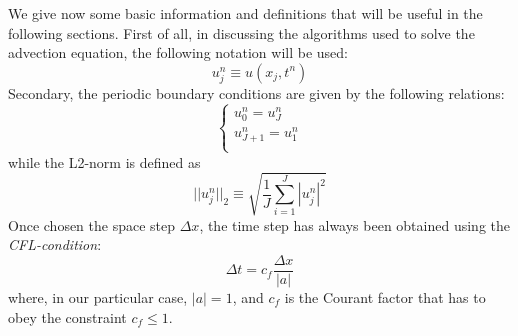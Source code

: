 \documentclass[11pt,a4paper]{article}
\begin{document}
We give now some basic information and definitions that will be useful in the following sections. First of all, in discussing the algorithms used to solve the advection equation, the following notation will be used:
\begin{equation}
u_j^n \equiv u(x_j,t^n)
\end{equation}
Secondary, the periodic boundary conditions are given by the following relations:
\begin{equation}
\begin{cases}
u_0^n = u_J^n \\
u^n_{J+1}=u_1^n \\
\end{cases}
\end{equation}
while the L2-norm is defined as
\begin{equation}
||u^n_j||_2 \equiv \sqrt{\frac{1}{J}\sum_{i=1}^J |u_j^n|^2}
\end{equation}
Once chosen the space step $\Delta x$, the time step has always been obtained using the \emph{CFL-condition}:
\begin{equation}
\Delta t = c_f \frac{\Delta x}{|a|}
\end{equation}
where, in our particular case, $|a|=1$, and $c_f$ is the Courant factor that has to obey the constraint $c_f \leq 1$. 
\end{document}
